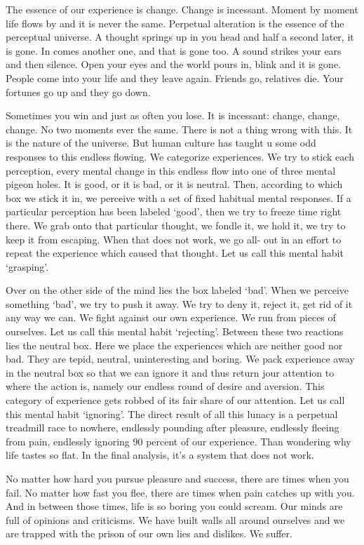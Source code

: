 The essence of our experience is change. Change is incessant. Moment by moment
life flows by and it is never the same. Perpetual alteration is the essence of
the perceptual universe. A thought springs up in you head and half a second
later, it is gone. In comes another one, and that is gone too. A sound strikes
your ears and then silence. Open your eyes and the world pours in, blink and it
is gone. People come into your life and they leave again. Friends go, relatives
die. Your fortunes go up and they go down.

Sometimes you win and just as often you lose. It is incessant: change, change,
change. No two moments ever the same.  There is not a thing wrong with this. It
is the nature of the universe. But human culture has taught u some odd responses
to this endless flowing. We categorize experiences. We try to stick each
perception, every mental change in this endless flow into one of three mental
pigeon holes. It is good, or it is bad, or it is neutral. Then, according to
which box we stick it in, we perceive with a set of fixed habitual mental
responses. If a particular perception has been labeled `good', then we try to
freeze time right there. We grab onto that particular thought, we fondle it, we
hold it, we try to keep it from escaping. When that does not work, we go all-
out in an effort to repeat the experience which caused that thought. Let us call
this mental habit `grasping'.

Over on the other side of the mind lies the box labeled `bad'. When we perceive
something `bad', we try to push it away. We try to deny it, reject it, get rid
of it any way we can. We fight against our own experience. We run from pieces of
ourselves. Let us call this mental habit `rejecting'. Between these two
reactions lies the neutral box. Here we place the experiences which are neither
good nor bad. They are tepid, neutral, uninteresting and boring. We pack
experience away in the neutral box so that we can ignore it and thus return jour
attention to where the action is, namely our endless round of desire and
aversion. This category of experience gets robbed of its fair share of our
attention. Let us call this mental habit `ignoring'. The direct result of all
this lunacy is a perpetual treadmill race to nowhere, endlessly pounding after
pleasure, endlessly fleeing from pain, endlessly ignoring 90 percent of our
experience. Than wondering why life tastes so flat. In the final analysis, it's
a system that does not work.

No matter how hard you pursue pleasure and success, there are times when you
fail. No matter how fast you flee, there are times when pain catches up with
you. And in between those times, life is so boring you could scream. Our minds
are full of opinions and criticisms. We have built walls all around ourselves
and we are trapped with the prison of our own lies and dislikes. We suffer.

